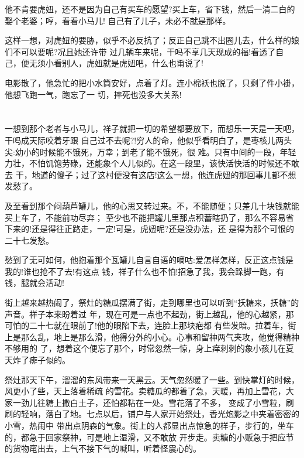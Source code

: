 \documentclass[11pt,a4paper,onecolumn]{article}
\begin{document}
他不肯要虎妞，还不是因为自己有买车的愿望?买上车，省下钱，然后一清二白的娶个老婆；哼，看看小马儿!
自己有了儿子，未必不就是那样。

这样一想，对虎妞的要胁，似乎不必反抗了；反正自己跳不出圈儿去，什么样的娘们不可以要呢?况且她还许带
过几辆车来呢，干吗不享几天现成的福!看透了自己，便无须小看别人，虎妞就是虎妞吧，什么也甭说了!

电影散了，他急忙的把小水筒安好，点着了灯。连小棉袄也脱了，只剩了件小褂，他想飞跑一气，跑忘了一
切，摔死也没多大关系!


\pagebreak
\section{}一想到那个老者与小马儿，祥子就把一切的希望都要放下，而想乐一天是一天吧，干吗成天际咬着牙跟
自己过不去呢?!穷人的命，他似乎看明白了，是枣核儿两头尖:幼小的时候能不饿死，万幸；到老了能不饿死，很
难。只有中间的一段，年轻力壮，不怕饥饱劳碌，还能象个人儿似的。在这一段里，该快活快活的时候还不敢去
干，地道的傻子；过了这村便没有这店!这么一想，他连虎妞的那回事儿都不想发愁了。

及至看到那个闷葫芦罐儿，他的心思又转过来。不，不能随便；只差几十块钱就能买上车了，不能前功尽弃；
至少也不能把罐儿里那点积蓄瞎扔了，那么不容易省下来的!还是得往正路走，一定!可是，虎妞呢?还是没办法，还
是得为那个可恨的二十七发愁。

愁到了无可如何，他抱着那个瓦罐儿自言自语的嘀咕:爱怎样怎样，反正这点钱是我的!谁也抢不了去!有这点
钱，祥子什么也不怕!招急了我，我会跺脚一跑，有钱，腿就会活动!

街上越来越热闹了，祭灶的糖瓜摆满了街，走到哪里也可以听到``扷糖来，扷糖''的声音。祥子本来盼着过
年，现在可是一点也不起劲，街上越乱，他的心越紧，那可怕的二十七就在眼前了!他的眼陷下去，连脸上那块疤都
有些发暗。拉着车，街上是那么乱，地上是那么滑，他得分外的小心。心事和留神两气夹攻，他觉得精神不够用的
了，想着这个便忘了那个，时常忽然一惊，身上痒刺刺的象小孩儿在夏天炸了痱子似的。

祭灶那天下午，溜溜的东风带来一天黑云。天气忽然暖了一些。到快掌灯的时候，风更小了些，天上落着稀疏
的雪花。卖糖瓜的都着了急，天暖，再加上雪花，大家一劲儿往糖上撒白土子，还怕都粘在一处。雪花落了不多，
变成了小雪粒，刷刷的轻响，落白了地。七点以后，铺户与人家开始祭灶，香光炮影之中夹着密密的小雪，热闹中
带出点阴森的气象。街上的人都显出点惊急的样子，步行的，坐车的，都急于回家祭神，可是地上湿滑，又不敢放
开步走。卖糖的小贩急于把应节的货物窀出去，上气不接下气的喊叫，听着怪震心的。
\end{document}

